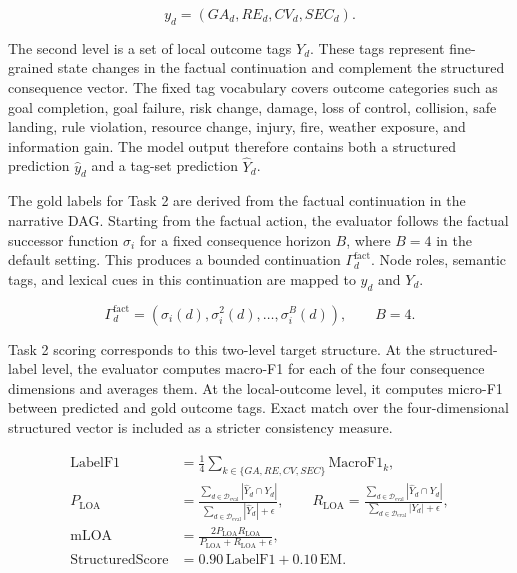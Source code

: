 \documentclass[pdflatex,sn-mathphys-num]{sn-jnl}%
\theoremstyle{thmstyleone}%
\theoremstyle{thmstyletwo}%
\theoremstyle{thmstylethree}%
\begin{document}
\begin{equation}
y_d=(GA_d,RE_d,CV_d,SEC_d).
\end{equation}

The second level is a set of local outcome tags $Y_d$. These tags represent fine-grained state changes in the factual continuation and complement the structured consequence vector. The fixed tag vocabulary covers outcome categories such as goal completion, goal failure, risk change, damage, loss of control, collision, safe landing, rule violation, resource change, injury, fire, weather exposure, and information gain. The model output therefore contains both a structured prediction $\hat{y}_d$ and a tag-set prediction $\hat{Y}_d$.

The gold labels for Task 2 are derived from the factual continuation in the narrative DAG. Starting from the factual action, the evaluator follows the factual successor function $\sigma_i$ for a fixed consequence horizon $B$, where $B=4$ in the default setting. This produces a bounded continuation $\Gamma_d^{\mathrm{fact}}$. Node roles, semantic tags, and lexical cues in this continuation are mapped to $y_d$ and $Y_d$.

\begin{equation}
\Gamma_d^{\mathrm{fact}}=(\sigma_i(d),\sigma_i^2(d),\ldots,\sigma_i^{B}(d)),\qquad B=4.
\end{equation}

Task 2 scoring corresponds to this two-level target structure. At the structured-label level, the evaluator computes macro-F1 for each of the four consequence dimensions and averages them. At the local-outcome level, it computes micro-F1 between predicted and gold outcome tags. Exact match over the four-dimensional structured vector is included as a stricter consistency measure.

\begin{align}
\mathrm{LabelF1}&=\frac{1}{4}\sum_{k\in\{GA,RE,CV,SEC\}}\mathrm{MacroF1}_k,\\
P_{\mathrm{LOA}}&=\frac{\sum_{d\in\mathcal{D}_{\mathrm{eval}}} |\hat{Y}_d\cap Y_d|}{\sum_{d\in\mathcal{D}_{\mathrm{eval}}} |\hat{Y}_d|+\epsilon},\qquad
R_{\mathrm{LOA}}=\frac{\sum_{d\in\mathcal{D}_{\mathrm{eval}}} |\hat{Y}_d\cap Y_d|}{\sum_{d\in\mathcal{D}_{\mathrm{eval}}} |Y_d|+\epsilon},\\
\mathrm{mLOA}&=\frac{2P_{\mathrm{LOA}}R_{\mathrm{LOA}}}{P_{\mathrm{LOA}}+R_{\mathrm{LOA}}+\epsilon},\\
\mathrm{StructuredScore}&=0.90\,\mathrm{LabelF1}+0.10\,\mathrm{EM}.
\end{align}
\end{document}
